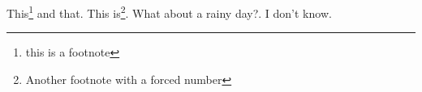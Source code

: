 \documentclass[12pt]{report}
\begin{document}
This\footnote{this is a footnote} and that. This is\footnote[23]{Another footnote with a forced number}. What about a rainy day?\footnotemark. I don't know. 

\end{document}
